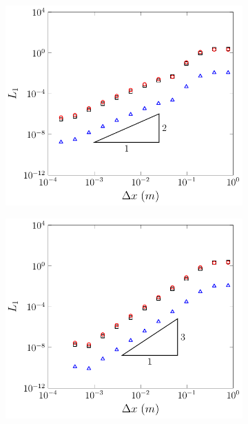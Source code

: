 \begin{figure}
\begin{subfigure}{0.5\textwidth}
		\vspace{0.5cm}
	\end{subfigure}
	\begin{subfigure}{0.5\textwidth}
		\includegraphics[width=\textwidth]{./chp5/figures/Analytic/Soliton/L1/FEVM2.pdf}
		\vspace{0.5cm}
	\end{subfigure}%
	\begin{subfigure}{0.5\textwidth}
		\includegraphics[width=\textwidth]{./chp5/figures/Analytic/Soliton/L1/FDVM3.pdf}

\end{subfigure}
\end{figure}
